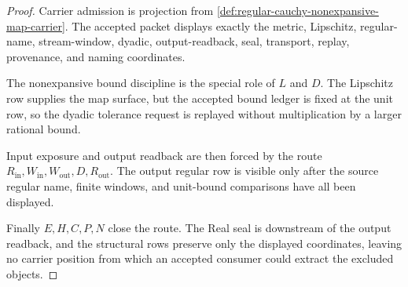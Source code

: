 \begin{proof}
Carrier admission is projection from \autoref{def:regular-cauchy-nonexpansive-map-carrier}. The accepted packet displays exactly the metric, Lipschitz, regular-name, stream-window, dyadic, output-readback, seal, transport, replay, provenance, and naming coordinates.

The nonexpansive bound discipline is the special role of $L$ and $D$. The Lipschitz row supplies the map surface, but the accepted bound ledger is fixed at the unit row, so the dyadic tolerance request is replayed without multiplication by a larger rational bound.

Input exposure and output readback are then forced by the route $R_{\mathrm{in}},W_{\mathrm{in}},W_{\mathrm{out}},D,R_{\mathrm{out}}$. The output regular row is visible only after the source regular name, finite windows, and unit-bound comparisons have all been displayed.

Finally $E,H,C,P,N$ close the route. The Real seal is downstream of the output readback, and the structural rows preserve only the displayed coordinates, leaving no carrier position from which an accepted consumer could extract the excluded objects.
\end{proof}

